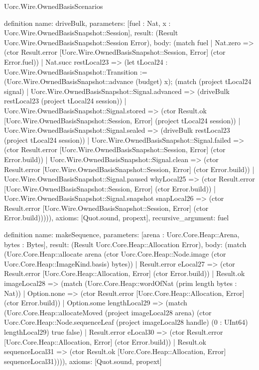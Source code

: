 \begin{lexlean}{Uorc.Wire.OwnedBasisScenarios}
\begin{semanticmodule}
definition{
  name: driveBulk,
  parameters: [fuel : Nat, x : Uorc.Wire.OwnedBasisSnapshot::Session],
  result: (Result Uorc.Wire.OwnedBasisSnapshot::Session Error),
  body: (match fuel
    | Nat.zero => (ctor Result.error [Uorc.Wire.OwnedBasisSnapshot::Session, Error] (ctor Error.fuel))
    | Nat.succ restLocal23 => (let tLocal24 : Uorc.Wire.OwnedBasisSnapshot::Transition := (Uorc.Wire.OwnedBasisSnapshot::advance (budget) x); (match (project tLocal24 signal)
      | Uorc.Wire.OwnedBasisSnapshot::Signal.advanced => (driveBulk restLocal23 (project tLocal24 session))
      | Uorc.Wire.OwnedBasisSnapshot::Signal.stored => (ctor Result.ok [Uorc.Wire.OwnedBasisSnapshot::Session, Error] (project tLocal24 session))
      | Uorc.Wire.OwnedBasisSnapshot::Signal.sealed => (driveBulk restLocal23 (project tLocal24 session))
      | Uorc.Wire.OwnedBasisSnapshot::Signal.failed => (ctor Result.error [Uorc.Wire.OwnedBasisSnapshot::Session, Error] (ctor Error.build))
      | Uorc.Wire.OwnedBasisSnapshot::Signal.clean => (ctor Result.error [Uorc.Wire.OwnedBasisSnapshot::Session, Error] (ctor Error.build))
      | Uorc.Wire.OwnedBasisSnapshot::Signal.paused whyLocal25 => (ctor Result.error [Uorc.Wire.OwnedBasisSnapshot::Session, Error] (ctor Error.build))
      | Uorc.Wire.OwnedBasisSnapshot::Signal.snapshot snapLocal26 => (ctor Result.error [Uorc.Wire.OwnedBasisSnapshot::Session, Error] (ctor Error.build))))),
  axioms: [Quot.sound, propext],
  recursive_argument: fuel
}

definition{
  name: makeSequence,
  parameters: [arena : Uorc.Core.Heap::Arena, bytes : Bytes],
  result: (Result Uorc.Core.Heap::Allocation Error),
  body: (match (Uorc.Core.Heap::allocate arena (ctor Uorc.Core.Heap::Node.image (ctor Uorc.Core.Heap::ImageKind.basis) bytes))
    | Result.error eLocal27 => (ctor Result.error [Uorc.Core.Heap::Allocation, Error] (ctor Error.build))
    | Result.ok imageLocal28 => (match (Uorc.Core.Heap::wordOfNat (prim length bytes : Nat))
      | Option.none => (ctor Result.error [Uorc.Core.Heap::Allocation, Error] (ctor Error.build))
      | Option.some lengthLocal29 => (match (Uorc.Core.Heap::allocateMoved (project imageLocal28 arena) (ctor Uorc.Core.Heap::Node.sequenceLeaf (project imageLocal28 handle) (0 : UInt64) lengthLocal29) true false)
        | Result.error eLocal30 => (ctor Result.error [Uorc.Core.Heap::Allocation, Error] (ctor Error.build))
        | Result.ok sequenceLocal31 => (ctor Result.ok [Uorc.Core.Heap::Allocation, Error] sequenceLocal31)))),
  axioms: [Quot.sound, propext]
}


\end{semanticmodule}
\end{lexlean}
